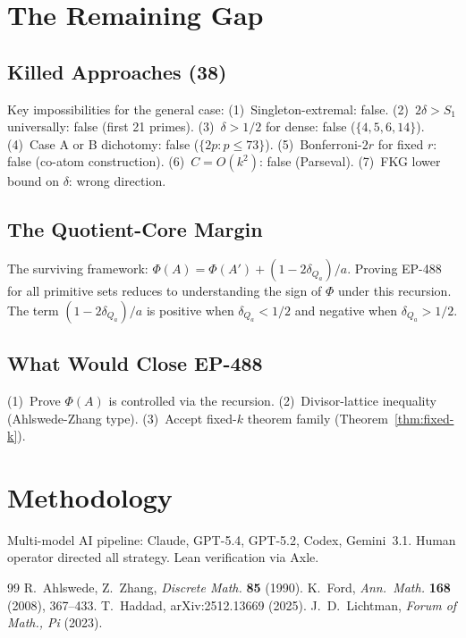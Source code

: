 \documentclass[11pt,a4paper]{article}
\theoremstyle{definition}
\begin{document}
\section{The Remaining Gap}

\subsection{Killed Approaches (38)}

Key impossibilities for the general case:
(1)~Singleton-extremal: false.
(2)~$2\delta > S_1$ universally: false (first 21 primes).
(3)~$\delta > 1/2$ for dense: false ($\{4,5,6,14\}$).
(4)~Case A or B dichotomy: false ($\{2p : p \leq 73\}$).
(5)~Bonferroni-$2r$ for fixed $r$: false (co-atom construction).
(6)~$C = O(k^2)$: false (Parseval).
(7)~FKG lower bound on $\delta$: wrong direction.

\subsection{The Quotient-Core Margin}

The surviving framework: $\Phi(A) = \Phi(A') + (1 - 2\delta_{Q_a})/a$.
Proving EP-488 for all primitive sets reduces to understanding the sign
of $\Phi$ under this recursion. The term $(1 - 2\delta_{Q_a})/a$ is
positive when $\delta_{Q_a} < 1/2$ and negative when $\delta_{Q_a} > 1/2$.

\subsection{What Would Close EP-488}

(1)~Prove $\Phi(A)$ is controlled via the recursion.
(2)~Divisor-lattice inequality (Ahlswede-Zhang type).
(3)~Accept fixed-$k$ theorem family (Theorem~\ref{thm:fixed-k}).

\section{Methodology}

Multi-model AI pipeline: Claude, GPT-5.4, GPT-5.2, Codex, Gemini~3.1.
Human operator directed all strategy. Lean verification via Axle.

\begin{thebibliography}{99}
 R.~Ahlswede, Z.~Zhang, \emph{Discrete Math.} \textbf{85} (1990).
 K.~Ford, \emph{Ann.\ Math.} \textbf{168} (2008), 367--433.
 T.~Haddad, arXiv:2512.13669 (2025).
 J.~D.~Lichtman, \emph{Forum of Math., Pi} (2023).
\end{thebibliography}
\end{document}
